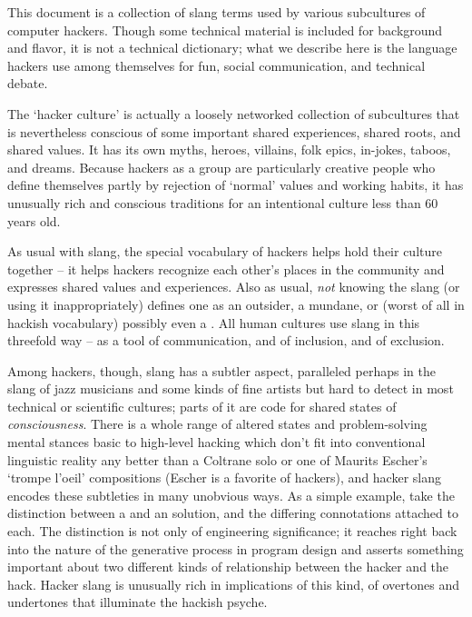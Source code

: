 This document is a collection of slang terms used by various subcultures of
computer hackers. Though some technical material is included for background and
flavor, it is not a technical dictionary; what we describe here is the language
hackers use among themselves for fun, social communication, and technical
debate.

The `hacker culture' is actually a loosely networked collection of subcultures
that is nevertheless conscious of some important shared experiences, shared
roots, and shared values. It has its own myths, heroes, villains, folk epics,
in-jokes, taboos, and dreams. Because hackers as a group are particularly
creative people who define themselves partly by rejection of `normal' values
and working habits, it has unusually rich and conscious traditions for an
intentional culture less than 60 years old.

As usual with slang, the special vocabulary of hackers helps hold their culture
together -- it helps hackers recognize each other's places in the community and
expresses shared values and experiences. Also as usual, \textit{not} knowing the
slang (or using it inappropriately) defines one as an outsider, a mundane, or
(worst of all in hackish vocabulary) possibly even a . All human
cultures use slang in this threefold way -- as a tool of communication, and of
inclusion, and of exclusion.

Among hackers, though, slang has a subtler aspect, paralleled perhaps in the
slang of jazz musicians and some kinds of fine artists but hard to detect in
most technical or scientific cultures; parts of it are code for shared states of
\textit{consciousness}. There is a whole range of altered states and
problem-solving mental stances basic to high-level hacking which don't fit into
conventional linguistic reality any better than a Coltrane solo or one of
Maurits Escher's `trompe l'oeil' compositions (Escher is a favorite of hackers),
and hacker slang encodes these subtleties in many unobvious ways. As a simple
example, take the distinction between a  and an
 solution, and the differing connotations attached to each.
The distinction is not only of engineering significance; it reaches right back
into the nature of the generative process in program design and asserts
something important about two different kinds of relationship between the hacker
and the hack. Hacker slang is unusually rich in implications of this kind, of
overtones and undertones that illuminate the hackish psyche.

